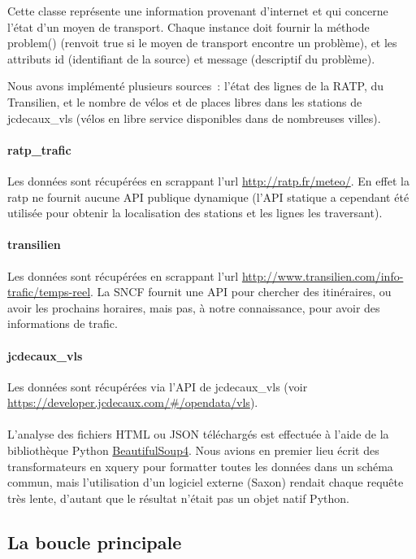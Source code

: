 \documentclass[a4paper, 8pt]{article}
\begin{document}
Cette classe représente une information provenant d'internet et qui concerne
l'état d'un moyen de transport.
Chaque instance doit fournir la méthode problem() (renvoit true si le moyen de
transport encontre un problème), et les attributs id (identifiant de la source)
et message (descriptif du problème).

Nous avons implémenté plusieurs sources~: l'état des lignes de la RATP, du
Transilien, et le nombre de vélos et de places libres dans les stations de
jcdecaux\_vls (vélos en libre service disponibles dans de nombreuses villes).

\paragraph{ratp\_trafic} Les données sont récupérées en scrappant l'url
\url{http://ratp.fr/meteo/}.
En effet la ratp ne fournit aucune API publique dynamique (l'API statique a
cependant été utilisée pour obtenir la localisation des stations et les lignes
les traversant).

\paragraph{transilien} Les données sont récupérées en scrappant l'url \url{http://www.transilien.com/info-trafic/temps-reel}.
La SNCF fournit une API pour chercher des itinéraires, ou avoir les prochains
horaires, mais pas, à notre connaissance, pour avoir des informations de trafic.

\paragraph{jcdecaux\_vls} Les données sont récupérées via l'API de jcdecaux\_vls
(voir \url{https://developer.jcdecaux.com/#/opendata/vls}).

\paragraph{} L'analyse des fichiers HTML ou JSON téléchargés est effectuée à
l'aide de la bibliothèque Python
\href{http://www.crummy.com/software/BeautifulSoup/bs4/doc/}{BeautifulSoup4}.
Nous avions en premier lieu écrit des transformateurs en xquery pour formatter
toutes les données dans un schéma commun, mais l'utilisation d'un logiciel
externe (Saxon) rendait chaque requête très lente, d'autant que le résultat
n'était pas un objet natif Python.

\subsection{La boucle principale}
\end{document}
